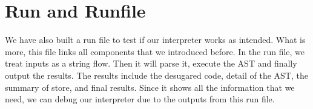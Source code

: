 \section{Run and Runfile}
We have also built a run file to test if our interpreter works as intended. What is more, this file links all components that we introduced before. In the run file, we treat inputs as a string flow. Then it will parse it, execute the AST and finally output the results. The results include the desugared code, detail of the AST, the summary of store, and final results. Since it shows all the information that we need, we can debug our interpreter due to the outputs from this run file.


